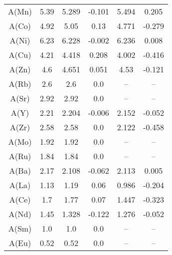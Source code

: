 \begin{table}[ht]
\begin{tabular}{cccccc}
A(Mn) & 5.39 & 5.289 & -0.101 & 5.494 & 0.205 \\
A(Co) & 4.92 & 5.05 & 0.13 & 4.771 & -0.279 \\
A(Ni) & 6.23 & 6.228 & -0.002 & 6.236 & 0.008 \\
A(Cu) & 4.21 & 4.418 & 0.208 & 4.002 & -0.416 \\
A(Zn) & 4.6 & 4.651 & 0.051 & 4.53 & -0.121 \\
A(Rb) & 2.6 & 2.6 & 0.0 & -- & -- \\
A(Sr) & 2.92 & 2.92 & 0.0 & -- & -- \\
A(Y) & 2.21 & 2.204 & -0.006 & 2.152 & -0.052 \\
A(Zr) & 2.58 & 2.58 & 0.0 & 2.122 & -0.458 \\
A(Mo) & 1.92 & 1.92 & 0.0 & -- & -- \\
A(Ru) & 1.84 & 1.84 & 0.0 & -- & -- \\
A(Ba) & 2.17 & 2.108 & -0.062 & 2.113 & 0.005 \\
A(La) & 1.13 & 1.19 & 0.06 & 0.986 & -0.204 \\
A(Ce) & 1.7 & 1.77 & 0.07 & 1.447 & -0.323 \\
A(Nd) & 1.45 & 1.328 & -0.122 & 1.276 & -0.052 \\
A(Sm) & 1.0 & 1.0 & 0.0 & -- & -- \\
A(Eu) & 0.52 & 0.52 & 0.0 & -- & -- \\
\hline
\end{tabular}
\end{table}